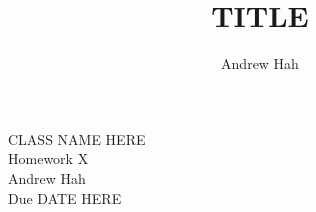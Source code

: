\documentclass[11pt]{article}
\title{TITLE}
\author{Andrew Hah}
\begin{document}
\pagestyle{plain}
\begin{center}
{\Large CLASS NAME HERE} \\
{\Large Homework X} \\
\vspace{.2in}
Andrew Hah \\
Due DATE HERE
\end{center}
\end{document}
